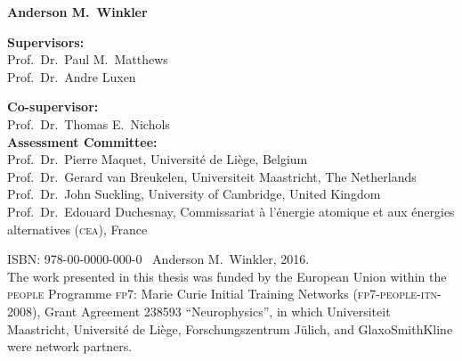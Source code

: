 \begin{center}
\begin{Large}
\textbf{Anderson M.\ Winkler}
\end{Large}
\end{center}

\vspace*{3cm}
\vspace*{\fill}

\newpage
{}
\noindent
\textbf{Supervisors:}\\
Prof.\ Dr.\ Paul M.\ Matthews\\
Prof.\ Dr.\ Andre Luxen

\vspace*{5mm}

\noindent
\textbf{Co-supervisor:}\\
Prof.\ Dr.\ Thomas E.\ Nichols\\


\noindent
\textbf{Assessment Committee:}\\
Prof.\ Dr.\ Pierre Maquet, Universit\'{e} de Li\`{e}ge, Belgium\\
Prof.\ Dr.\ Gerard van Breukelen, Universiteit Maastricht, The Netherlands\\
Prof.\ Dr.\ John Suckling, University of Cambridge, United Kingdom\\
Prof.\ Dr.\ Edouard Duchesnay, Commissariat \`{a} l'\'{e}nergie atomique et aux \'{e}nergies alternatives (\textsc{cea}), France

\vfill

\noindent
ISBN: 978-00-0000-000-0 \textcopyright\ Anderson M.\ Winkler, 2016.\\
The work presented in this thesis was funded by the European Union within the \textsc{people} Programme \textsc{fp7}: Marie Curie Initial Training Networks (\textsc{fp7-people-itn-2008}), Grant Agreement 238593 ``Neurophysics'', in which Universiteit Maas\-tricht, Universit\'{e} de Li\`{e}ge, Forschungszentrum J\"{u}lich, and GlaxoSmithKline were network partners.

